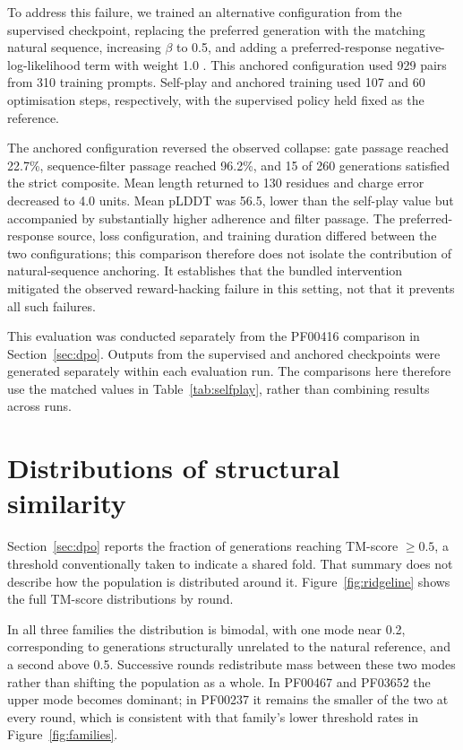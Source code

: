 \documentclass{article} %
\begin{document}
To address this failure, we trained an alternative configuration from the supervised checkpoint, replacing the preferred generation with the matching natural sequence, increasing
$\beta$ to 0.5, and adding a preferred-response negative-log-likelihood term with weight 1.0 \citep{pang2024rpo}. This anchored configuration used 929
pairs from 310 training prompts. Self-play and anchored training used 107 and 60 optimisation steps, respectively, with the supervised policy held fixed as the reference.

The anchored configuration reversed the observed collapse: gate passage reached 22.7\%, sequence-filter passage reached
96.2\%, and 15 of 260 generations satisfied the strict composite. Mean length returned to 130 residues and charge error decreased to 4.0 units. Mean pLDDT was 56.5, lower
than the self-play value but accompanied by substantially higher adherence and filter passage. The preferred-response source, loss configuration, and training duration differed
between the two configurations; this comparison therefore does not isolate the contribution of natural-sequence anchoring. It establishes that the bundled intervention
mitigated the observed reward-hacking failure in this setting,
not that it prevents all such failures.

This evaluation was conducted separately from the PF00416 comparison in Section~\ref{sec:dpo}. Outputs from the supervised and anchored checkpoints were generated separately within each evaluation run. The comparisons here therefore use the matched values in
Table~\ref{tab:selfplay}, rather than combining results across runs.


\section{Distributions of structural similarity}\label{app:tm}
Section~\ref{sec:dpo} reports the fraction of generations reaching TM-score
$\geq0.5$, a threshold conventionally taken to indicate a shared fold. That
summary does not describe how the population is distributed around it.
Figure~\ref{fig:ridgeline} shows the full TM-score distributions by round.

In all three families the distribution is bimodal, with one mode near 0.2,
corresponding to generations structurally unrelated to the natural reference,
and a second above 0.5. Successive rounds redistribute mass between these two
modes rather than shifting the population as a whole. In PF00467 and PF03652
the upper mode becomes dominant; in PF00237 it remains the smaller of the two
at every round, which is consistent with that family's lower threshold rates in
Figure~\ref{fig:families}.
\end{document}
